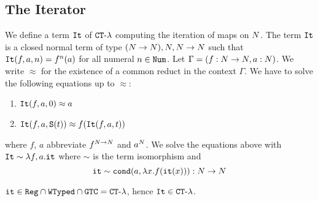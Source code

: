 %




\subsection{The Iterator}

\begin{Eg}
We define a term ${\tt It}$ of  ${ {\tt CT}\mbox{-}\lambda}$ computing the iteration of maps on ${N}$.
The term ${\tt It}$ is a closed normal term of type $({N} \rightarrow {N}), {N},{N} \rightarrow {N}$ such 
that ${\tt It}(f,a,n)=f^n(a)$ for all numeral $n \in {\tt Num}$. 
Let $\Gamma = (f:{N} \rightarrow {N}, a:{N})$. We write $\approx$ for
the existence of a common reduct in the context $\Gamma$. 
We have to solve the following equations up to $\approx$:

\begin{enumerate}
\item
${\tt It}(f,a,0) \approx a$ 
\item
${\tt It}(f,a,{\tt S} (t)) \approx f({\tt It}(f,a,t))$
\end{enumerate}

where $f$, $a$ abbreviate $f^{{N}\rightarrow{N}}$ and $a^{N}$.
We solve the equations above with ${\tt It} \sim \lambda f, a.{\tt it}$
where $\sim$ is the term isomorphism and
$$
{\tt it} \sim {\tt cond} (a, \lambda x.f({\tt it}(x))):{N} \rightarrow {N}
$$ 
\end{Eg}

\begin{proposition}
\label{proposition-iterator-in-CT-lambda}
${\tt it} \in {\tt Reg} \cap {\tt WTyped} \cap {\tt GTC} = { {\tt CT}\mbox{-}\lambda}$, 
hence ${\tt It} \in { {\tt CT}\mbox{-}\lambda}$.
\end{proposition}

